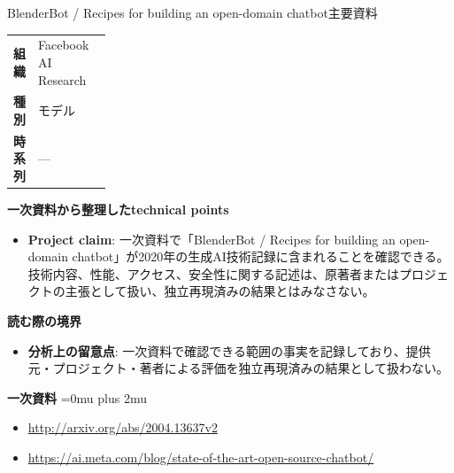 \begin{technicalnote}{BlenderBot / Recipes for building an open-domain chatbot}{主要資料}
\begingroup
\begin{tabularx}{\linewidth}{@{}>{\bfseries}p{0.22\linewidth}X@{}}
組織 & Facebook AI Research \\
種別 & モデル \\
時系列 & — \\
\end{tabularx}
\smallskip
{\bfseries 一次資料から整理したtechnical points}
\begin{itemize}[leftmargin=1.5em,itemsep=0.35em]
\item \textbf{Project claim}: 一次資料で「BlenderBot / Recipes for building an open-domain chatbot」が2020年の生成AI技術記録に含まれることを確認できる。技術内容、性能、アクセス、安全性に関する記述は、原著者またはプロジェクトの主張として扱い、独立再現済みの結果とはみなさない。
\end{itemize}
\begin{minipage}{\linewidth}
{\bfseries 読む際の境界}
\begin{itemize}[leftmargin=1.5em,itemsep=0.35em]
\item \textbf{分析上の留意点}: 一次資料で確認できる範囲の事実を記録しており、提供元・プロジェクト・著者による評価を独立再現済みの結果として扱わない。
\end{itemize}
\begin{samepage}
{\bfseries 一次資料}
\begingroup\sloppy
\Urlmuskip=0mu plus 2mu\relax
\begin{itemize}[leftmargin=1.5em,itemsep=0.25em]
\item {\scriptsize\url{http://arxiv.org/abs/2004.13637v2}}
\item {\scriptsize\url{https://ai.meta.com/blog/state-of-the-art-open-source-chatbot/}}
\end{itemize}
\endgroup
\end{samepage}
\end{minipage}
\endgroup
\end{technicalnote}
\medskip
